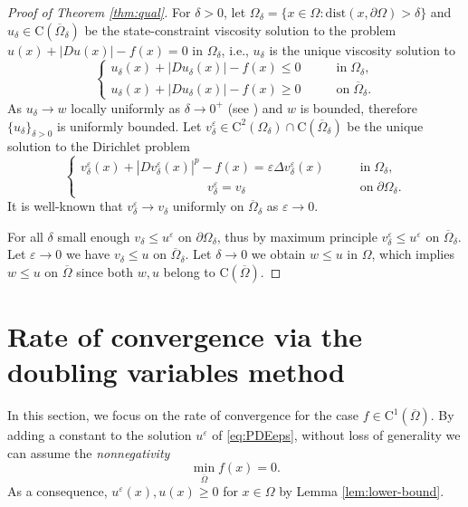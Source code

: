\documentclass[11pt,reqno]{amsart}
\numberwithin{figure}{section}
\theoremstyle{plain}
\theoremstyle{remark}
\numberwithin{equation}{section}
\newcommand{\rmC}{\mathrm{C}}
\begin{document}
\begin{proof}[Proof of Theorem \ref{thm:qual}]
For $\delta>0$, let $\Omega_\delta = \{x\in \Omega: \mathrm{dist}(x,\partial \Omega) > \delta\}$ and $u_\delta\in\rmC(\overline{\Omega}_\delta)$ be the state-constraint viscosity solution to the problem $  u(x) + |Du(x)| - f(x) = 0$ in $\Omega_\delta$, i.e., $u_\delta$ is the unique viscosity solution to
\begin{equation}\label{e:v_v}
    \begin{cases}
      u_\delta(x) + |Du_\delta(x)|-f(x) \leq 0 &\qquad\text{in}\;\Omega_\delta,\\
      u_\delta(x) + |Du_\delta(x)| - f(x) \geq 0 &\qquad\text{on}\;\overline{\Omega}_\delta.
    \end{cases}
\end{equation}
As $u_\delta\rightarrow w$ locally uniformly as $\delta\rightarrow 0^+$ (see \cite{kim_state-constraint_2020}) and $w$ is bounded, therefore $\{u_\delta\}_{\delta>0}$ is uniformly bounded. Let $v^\varepsilon_\delta\in \rmC^2(\Omega_\delta)\cap \rmC(\overline{\Omega}_\delta)$ be the unique solution to the Dirichlet problem
\begin{equation}\label{eq:vv_eps}
\begin{cases}
      v_\delta^\varepsilon(x) + |Dv_\delta^\varepsilon(x)|^p - f(x) = \varepsilon \Delta v_\delta^\varepsilon(x) &\qquad\text{in}\;\Omega_\delta,\\
    \;\;\;\,\quad\qquad\qquad\qquad\qquad v_\delta^\varepsilon = v_\delta &\qquad \text{on}\;\partial\Omega_\delta.
\end{cases}
\end{equation}
It is well-known that $v^\varepsilon_\delta\to v_\delta$ uniformly on $\overline{\Omega}_\delta$ as $\varepsilon\to 0$.

For all $\delta$ small enough $v_\delta\leq u^\varepsilon$ on $\partial \Omega_\delta$, thus by maximum principle $v^\varepsilon_\delta \leq u^\varepsilon$ on $\overline{\Omega}_\delta$. Let $\varepsilon\to 0$ we have $v_\delta \leq u$ on $\overline{\Omega}_\delta$.
Let $\delta\rightarrow 0$ we obtain $w\leq u$ in $\Omega$, which implies $w\leq u$ on $\overline{\Omega}$ since both $w,u$ belong to $\rmC(\overline{\Omega})$.
\end{proof}


\section{Rate of convergence via the doubling variables method}
In this section, we focus on the rate of convergence for the case $f\in \mathrm{C}^1(\overline{\Omega})$. By adding a constant to the solution $u^\varepsilon$ of \eqref{eq:PDEeps}, without loss of generality we can assume the \emph{nonnegativity}
\begin{equation}\label{e:minf}
    \min_{\overline{\Omega}} f(x) = 0.
\end{equation}
As a consequence, $u^\varepsilon(x),u(x)\geq 0$ for $x\in \Omega$ by Lemma \ref{lem:lower-bound}.
\end{document}
